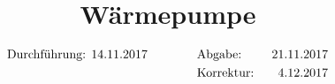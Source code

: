

\subject{v206}
\title{Wärmepumpe}
\date{%
\begin{align}
& \text{Durchführung: 14.11.2017} & \hspace{3em} & \text{Abgabe: } & {21.11.2017}&\notag \\
& & &\text{Korrektur: } & \text{4.12.2017}& \notag
\end{align}
}



\maketitle
\thispagestyle{empty}
\tableofcontents
\newpage






\nocite{*}
\printbibliography{}


